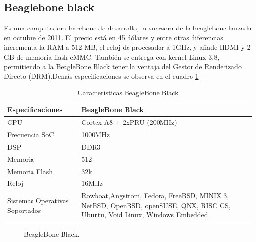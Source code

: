 \documentclass[conference]{IEEEtran}
\begin{document}
	\subsection{Beaglebone black}
	Es una computadora barebone de desarrollo, la sucesora de la beaglebone lanzada en octubre de 2011. El precio está en 45 dólares y entre otras diferencias incrementa la RAM a 512 MB, el reloj de procesador a 1GHz, y añade HDMI y 2 GB de memoria flash eMMC. También se entrega con kernel Linux 3.8, permitiendo a la BeagleBone Black tener la ventaja del Gestor de Renderizado Directo (DRM).Demás especificaciones se observa en el cuadro \ref{tab:bb01}
		\begin{table}[h]
\begin{center}
	\begin{tabular}{|p{2.5cm}|p{5.5cm}|}
	\hline 
	\textbf{Especificaciones} &\textbf{BeagleBone Black} \\ \hline
	CPU  &Cortex-A8 + 2xPRU (200MHz) \\\hline
	Frecuencia SoC &1000MHz \\\hline
	DSP &DDR3 \\\hline
	Memoria & 512 \\\hline
	Memoria Flash &32k\\\hline
	Reloj &16MHz \\\hline
	Sistemas Operativos Soportados &Rowboat,Angstrom, Fedora, FreeBSD, MINIX 3, NetBSD, OpenBSD, openSUSE, QNX, RISC OS, Ubuntu, Void Linux, Windows Embedded.\\\hline
\end{tabular}\vspace{0.25cm}
\caption{Características BeagleBone Black}
\label{tab:bb01}
\end{center}
\end{table}
\begin{figure}[h]
	\caption{BeagleBone Black.}
	\label{fig:ant01}
\end{figure}
\end{document}
